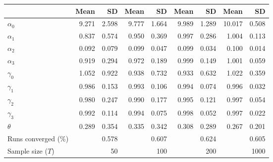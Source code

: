 
\begin{tabular}[t]{lrrrrrrrr}
\toprule
  & Mean & SD & Mean  & SD  & Mean   & SD   & Mean    & SD   \\
\midrule
$\alpha_{0}$ & 9.271 & 2.598 & 9.777 & 1.664 & 9.989 & 1.289 & 10.017 & 0.508\\
$\alpha_{1}$ & 0.837 & 0.574 & 0.950 & 0.369 & 0.997 & 0.286 & 1.004 & 0.113\\
$\alpha_{2}$ & 0.092 & 0.079 & 0.099 & 0.047 & 0.099 & 0.034 & 0.100 & 0.014\\
$\alpha_{3}$ & 0.919 & 0.294 & 0.972 & 0.189 & 0.999 & 0.149 & 1.001 & 0.059\\
$\gamma_{0}$ & 1.052 & 0.922 & 0.938 & 0.732 & 0.933 & 0.632 & 1.022 & 0.359\\
$\gamma_{1}$ & 0.986 & 0.153 & 0.993 & 0.106 & 0.994 & 0.074 & 0.996 & 0.032\\
$\gamma_{2}$ & 0.980 & 0.247 & 0.990 & 0.177 & 0.995 & 0.121 & 0.997 & 0.054\\
$\gamma_{3}$ & 0.992 & 0.114 & 0.994 & 0.075 & 0.998 & 0.052 & 0.997 & 0.022\\
$\theta$ & 0.289 & 0.354 & 0.335 & 0.342 & 0.308 & 0.289 & 0.267 & 0.201\\
Runs converged (\%) &  & 0.578 &  & 0.607 &  & 0.624 &  & 0.605\\
Sample size ($T$) &  & 50 &  & 100 &  & 200 &  & 1000\\
\bottomrule
\end{tabular}
